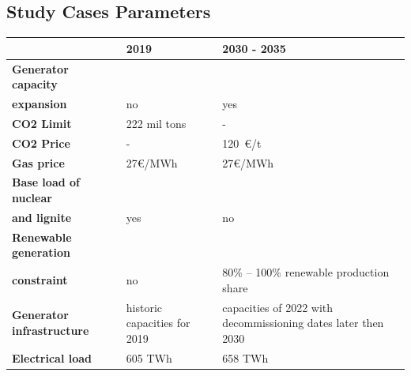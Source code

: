 \documentclass[preprint,12pt]{elsarticle}
\begin{document}
\subsection{Study Cases Parameters}\label{tab:cases_parameters}
\begin{tabularx}{\linewidth}{>{\bfseries}l  X  X}
    \hline
    { }                      & 2019                         & 2030 - 2035                                                   \\
    \hline
    Generator capacity                                                                                                      \\expansion    &            no &                           yes \\
    CO2 Limit                & 222 mil tons                 & -                                                             \\
    CO2 Price                & -                            & 120~\euro{}/t                                                 \\
    Gas price& 27\euro{}/MWh & 27\euro{}/MWh\\
    Base load of nuclear                                                                                                    \\and lignite &           yes &                            no \\
    Renewable generation                                                                                                    \\constraint &            no &      80\% -- 100\% renewable production share \\
    Generator infrastructure & historic capacities for 2019 & capacities of 2022 with decommissioning dates later then 2030 \\
    Electrical load          & 605 TWh                      & 658 TWh                                                       \\
    \hline
\end{tabularx}
\end{document}
